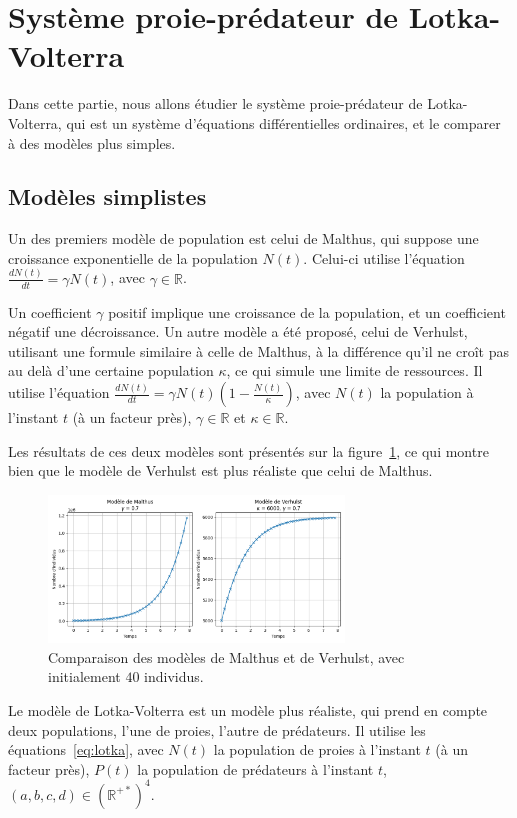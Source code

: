 \section{Système proie-prédateur de Lotka-Volterra}\label{sec:sec2}
Dans cette partie, nous allons étudier le système proie-prédateur de Lotka-Volterra,
qui est un système d'équations différentielles ordinaires,
et le comparer à des modèles plus simples.


\subsection{Modèles simplistes}
Un des premiers modèle de population est celui de Malthus, qui suppose une croissance exponentielle de la population $N(t)$.
Celui-ci utilise l'équation $\frac{dN(t)}{dt} = \gamma N(t)$, avec $\gamma \in \mathbb{R}$.

Un coefficient $\gamma$ positif implique une croissance de la population, et un coefficient négatif une décroissance.
Un autre modèle a été proposé, celui de Verhulst, utilisant une formule similaire à celle de Malthus,
à la différence qu'il ne croît pas au delà d'une certaine population $\kappa$, ce qui simule une limite de ressources.
Il utilise l'équation $\frac{dN(t)}{dt} = \gamma N(t) \left( 1 - \frac{N(t)}{\kappa} \right)$,
avec $N(t)$ la population à l'instant $t$ (à un facteur près), $\gamma \in \mathbb{R}$ et $\kappa \in \mathbb{R}$.

Les résultats de ces deux modèles sont présentés sur la figure~\ref{fig:populations}, ce qui montre bien que le modèle de Verhulst
est plus réaliste que celui de Malthus.

\begin{figure}[htbp!]
	\centering
	\includegraphics[width=0.7\textwidth]{res/population}
	\caption{Comparaison des modèles de Malthus et de Verhulst, avec initialement $40$ individus.}
	\label{fig:populations}
\end{figure}

Le modèle de Lotka-Volterra est un modèle plus réaliste, qui prend en compte deux populations,
l'une de proies, l'autre de prédateurs.
Il utilise les équations~\ref{eq:lotka}, avec $N(t)$ la population de proies à l'instant $t$ (à un facteur près),
$P(t)$ la population de prédateurs à l'instant $t$, $(a, b, c, d) \in (\mathbb{R}^{+*})^4$.

